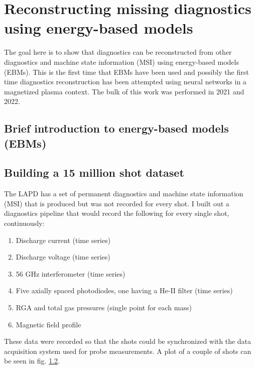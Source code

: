 \graphicspath{{Chapters/Chapter_ebm/}}

\chapter{Reconstructing missing diagnostics using energy-based models}
\label{ch:ebm}

The goal here is to show that diagnostics can be reconstructed from other diagnostics and machine state information (MSI) using energy-based models (EBMs). This is the first time that EBMs have been used and possibly the first time diagnostics reconstruction has been attempted using neural networks in a magnetized plasma context. The bulk of this work was performed in 2021 and 2022.  

\section{Brief introduction to energy-based models (EBMs)}

\section{Building a 15 million shot dataset}

The LAPD has a set of permanent diagnostics and machine state information (MSI) that is produced but was not recorded for every shot. I built out a diagnostics pipeline that would record the following for every single shot, continuously:
\begin{enumerate}
	\item Discharge current (time series)
	\item Discharge voltage (time series)
	\item 56 GHz interferometer (time series)
	\item Five axially spaced photodiodes, one having a He-II filter (time series)
	\item RGA and total gas pressures (single point for each mass)
	\item Magnetic field profile
\end{enumerate}
These data were recorded so that the shots could be synchronized with the data acquisition system used for probe measurements. A plot of a couple of shots can be seen in fig. \ref{}.

